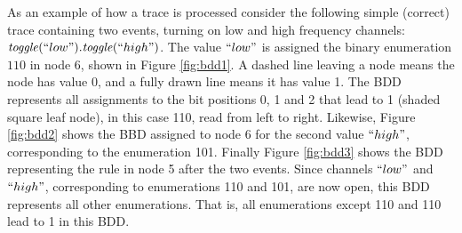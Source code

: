 %
As an example of how a trace is processed consider the following simple (correct) trace containing two events, turning on low and high frequency channels:
$\mathit{toggle}(``low").\mathit{toggle}(``high")$. The value $``low"$ is assigned the binary enumeration $110$ in node 6, shown in Figure \ref{fig:bdd1}. A dashed line leaving a node means the node has value 0, and a fully drawn line means it has value 1. The BDD represents all assignments to the bit positions 0, 1 and 2 that lead to 1 (shaded square leaf node), in this case 110, read from left to right. Likewise, Figure \ref{fig:bdd2} shows the BBD assigned to node 6 for the second value $``high"$, corresponding to the enumeration 101. Finally Figure \ref{fig:bdd3} shows the BDD representing the rule  in node 5 after the two events. Since channels $``low"$ and $``high"$, corresponding to enumerations 110 and 101, are now open, this BDD represents all other enumerations. That is, all enumerations except 110 and 110 lead to 1 in this BDD.

